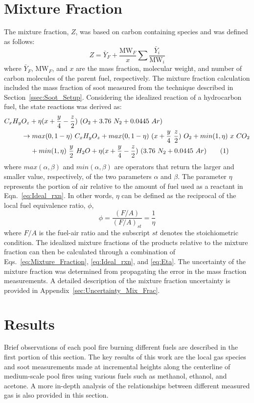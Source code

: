 \documentclass[12pt]{article}
\newcommand\numberthis{\addtocounter{equation}{1}\tag{\theequation}}
\begin{document}
\section{Mixture Fraction}
\label{sec:Mixture_Fraction}
The mixture fraction, $Z$, was based on carbon containing species and was defined as follows:
\begin{equation}\label{eq:Mixture_Fraction}
Z=\bar{Y}_{F}+\frac{{\textrm{MW}_{F}}}{x}\sum{\frac{\bar{Y}_{i}}{{\textrm{MW}_{i}}}}
\end{equation}
where $\bar{Y}_{F}$, ${\textrm{MW}_{F}}$, and $x$ are the mass fraction, molecular weight, and number of carbon molecules of the parent fuel, respectively. The mixture fraction calculation included the mass fraction of soot measured from the technique described in Section~\ref{ssec:Soot_Setup}.
Considering the idealized reaction of a hydrocarbon fuel, the state reactions was derived as:
\begin{align*}
C_{x}H_{y}&O_{z}+\eta(x+\frac{y}{4}-\frac{z}{2})~(O_{2}+3.76~N_{2}+0.0445~Ar)\\
&\rightarrow max(0,1-\eta)~C_{x}H_{y}O_{z}+max(0,1-\eta)~(x+\frac{y}{4}~\frac{z}{2})~O_{2}+ min(1,\eta)~x~CO_{2}\\
&~~~~+min(1,\eta)~\frac{y}{2}~H_{2}O+\eta(x+\frac{y}{4}-\frac{z}{2})~(3.76~N_{2}+0.0445~Ar) \numberthis \label{eq:Ideal_rxn}
\end{align*}
where $max(\alpha,\beta)$ and $min(\alpha,\beta)$ are operators that return the larger and smaller value, respectively, of the two parameters $\alpha$ and $\beta$. The parameter $\eta$ represents the portion of air relative to the amount of fuel used as a reactant in Eqn.~\ref{eq:Ideal_rxn}. In other words, $\eta$ can be defined as the reciprocal of the local fuel equivalence ratio, $\phi$,
\begin{equation}\label{eq:Eta}
\phi=\frac{(F/A)}{(F/A)_{st}}=\frac{1}{\eta}
\end{equation}
where $F/A$ is the fuel-air ratio and the subscript $st$ denotes the stoichiometric condition. The idealized mixture fractions of the products relative to the mixture fraction can then be calculated through a combination of Eqs.~\ref{eq:Mixture_Fraction}, \ref{eq:Ideal_rxn}, and \ref{eq:Eta}. The uncertainty of the mixture fraction was determined from propagating the error in the mass fraction measurements. A detailed description of the mixture fraction uncertainty is provided in Appendix~\ref{sec:Uncertainty_Mix_Frac}.

\section{Results}
\label{sec:Results}
Brief observations of each pool fire burning different fuels are described in the first portion of this section. The key results of this work are the local gas species and soot measurements made at incremental heights along the centerline of medium-scale pool fires using various fuels such as methanol, ethanol, and acetone. A more in-depth analysis of the relationships between different measured gas is also provided in this section.
\end{document}
